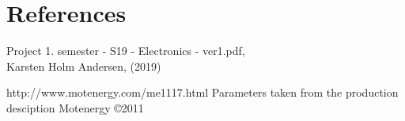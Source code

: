 \section{References}


\begin{thebibliography}{9}
Project 1. semester - S19 - Electronics - ver1.pdf, \\
Karsten Holm Andersen, (2019)

http://www.motenergy.com/me1117.html
Parameters taken from the production desciption
Motenergy \copyright 2011
 

\end{thebibliography}